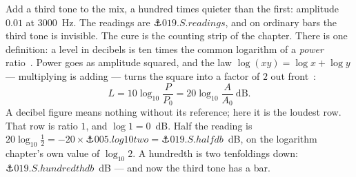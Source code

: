 \begin{narrative}
Add a third tone to the mix, a hundred times quieter than the first:
amplitude $0.01$ at $3000$~Hz. The readings are
$\anchor{019.S.readings}$, and on ordinary bars the third tone is
invisible. The cure is the counting strip of the  chapter.
There is one definition: a level in decibels is ten times the common
logarithm of a \emph{power}
ratio~\cite{signal_processing-martin-decibel-the-name-for-the-transmission-unit-1929}.
Power goes as amplitude squared, and the law $\log(xy) = \log x + \log
y$ — multiplying is adding — turns the square into a factor of $2$ out
front~\cite{signal_processing-j-o-smith-mdft-decibels,signal_processing-nist-sp-811-8-7-logarithmic-quantities-and-units}:
\[
  L = 10 \log_{10} \frac{P}{P_0} = 20 \log_{10} \frac{A}{A_0}
  \ \text{dB} .
\]
A decibel figure means nothing without its reference; here it is the
loudest row. That row is ratio $1$, and $\log 1 = 0$~dB. Half the
reading is $20 \log_{10} \tfrac12 = -20 \times \anchor{005.log10two} =
\anchor{019.S.halfdb}$~dB, on the logarithm chapter's own value of
$\log_{10} 2$. A hundredth is two tenfoldings down:
$\anchor{019.S.hundredthdb}$~dB — and now the third tone has a bar.

\begin{center}
\end{center}


\end{narrative}
